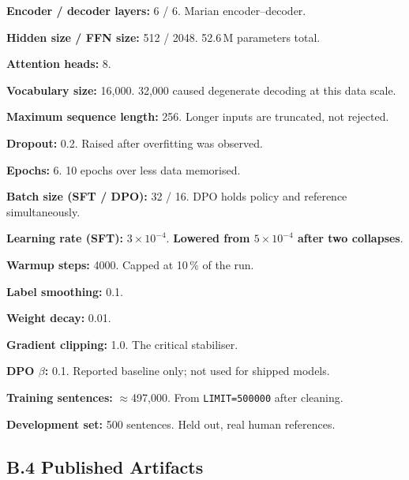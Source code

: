 \begin{bullets}
\item \textbf{Encoder / decoder layers:} 6 / 6. Marian encoder--decoder.
\item \textbf{Hidden size / FFN size:} 512 / 2048. 52.6\,M parameters total.
\item \textbf{Attention heads:} 8.
\item \textbf{Vocabulary size:} 16{,}000. 32{,}000 caused degenerate decoding at this data scale.
\item \textbf{Maximum sequence length:} 256. Longer inputs are truncated, not rejected.
\item \textbf{Dropout:} 0.2. Raised after overfitting was observed.
\item \textbf{Epochs:} 6. 10 epochs over less data memorised.
\item \textbf{Batch size (SFT / DPO):} 32 / 16. DPO holds policy and reference simultaneously.
\item \textbf{Learning rate (SFT):} $3\times10^{-4}$. \textbf{Lowered from $5\times10^{-4}$ after two collapses}.
\item \textbf{Warmup steps:} 4000. Capped at 10\,\% of the run.
\item \textbf{Label smoothing:} 0.1.
\item \textbf{Weight decay:} 0.01.
\item \textbf{Gradient clipping:} 1.0. The critical stabiliser.
\item \textbf{DPO $\beta$:} 0.1. Reported baseline only; not used for shipped models.
\item \textbf{Training sentences:} $\approx$497{,}000. From \texttt{LIMIT=500000} after cleaning.
\item \textbf{Development set:} 500 sentences. Held out, real human references.
\end{bullets}

\subsection*{B.4 Published Artifacts}

